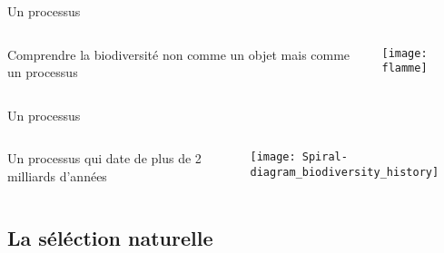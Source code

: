 \documentclass[10pt]{beamer}
\begin{document}
\begin{frame}{Un processus} 
  \begin{columns}
    \begin{column}[c]{0.6\textwidth}
      Comprendre la biodiversité non comme un objet mais comme un
      processus
    \end{column}
    \begin{column}[c]{0.4\textwidth}
      \begin{center}
       \texttt{[image: flamme]}     
      \end{center}
    \end{column}
  \end{columns}
\end{frame}





\begin{frame}{Un processus} 
  \begin{columns}
    \begin{column}[c]{0.35\textwidth}
      Un processus qui date de plus de 2 milliards d'années
    \end{column}
    \begin{column}[c]{0.65\textwidth}
      \begin{center}
        \texttt{[image: Spiral-diagram\_biodiversity\_history]}
       \end{center}
    \end{column}
  \end{columns}
\end{frame}





\subsection{La séléction naturelle}
\end{document}
